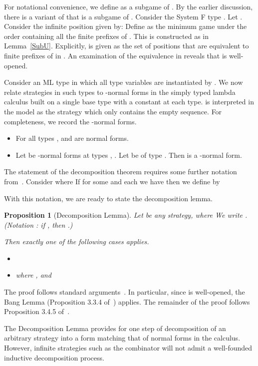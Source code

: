 \documentclass[a4paper,11pt]{article}
\newtheorem{proposition}{Proposition}[section]
\begin{document}
For notational convenience, we define  as a subgame of
.  By the earlier discussion, there is a variant of 
that is a subgame of .  Consider the System F type .  Let .
Consider the infinite position  given by:
 Define  as the minimum game
under the  order containing all the finite prefixes of .
This is constructed as in Lemma~\ref{SubU}.  Explicitly,  is
given  as  the set of positions that are equivalent to
finite prefixes of
 in .  An examination of the equivalence
in  reveals that  is well-opened.

Consider an ML type in which all type variables are instantiated
by .  We now relate strategies in such types  to
-normal forms in the simply typed lambda calculus
built on a single base type  with a constant  at
each type.  is interpreted in the model as the strategy
 which only contains the empty sequence. For completeness,
we record the  -normal forms.
\begin{itemize}
\item For all types ,  and   are  normal forms.
\item Let  be -normal forms at types , .  Let  be of type .   Then  is a -normal form.
\end{itemize}

The statement of the decomposition theorem requires some further
notation from~\cite{AJM00}.   Consider
 where
 If for some  and each  we have
 then we define
 by


With this notation, we are ready to state the decomposition lemma.
\begin{proposition}[Decomposition Lemma]\label{decomp}
Let  be
any strategy, where  We write
.
(Notation : if , then
.)

Then exactly one of the following cases applies.
\begin{itemize}
\item[(i)] 
\item[(ii)]
   where , and

\end{itemize}
\end{proposition}
The proof follows standard arguments~\cite{AJM00,AL00}. In
particular, since  is well-opened, the Bang Lemma
(Proposition 3.3.4 of~\cite{AJM00}) applies. The remainder of the
proof follows Proposition 3.4.5 of~\cite{AJM00}.

The Decomposition Lemma provides for one step of decomposition of
an arbitrary strategy into a form matching that of 
normal forms in the  calculus. However, infinite
strategies such as the  combinator  will not admit a well-founded
inductive decomposition process.
\end{document}
